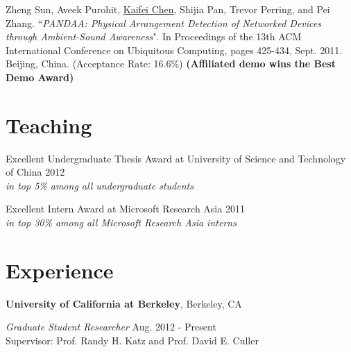 \documentclass[margin,line]{res}
\begin{document}
\begin{resume}
      \vspace*{-2.0mm}
      Zheng Sun, Aveek Purohit, \underline{Kaifei Chen}, Shijia Pan, Trevor Perring, and Pei Zhang. ``{\it PANDAA: Physical Arrangement Detection of Networked Devices through Ambient-Sound Awareness}". In Proceedings of the 13th ACM International Conference on Ubiquitous Computing, pages 425-434, Sept. 2011. Beijing, China. (Acceptance Rate: 16.6\%) {\bf (Affiliated demo wins the Best Demo Award)}


    \section{\sc Teaching}

      Excellent Undergraduate Thesis Award at University of Science and Technology of China \hfill 2012\\
      {\it in top 5\% among all undergraduate students}

      \vspace*{-2.5mm}
      Excellent Intern Award at Microsoft Research Asia \hfill 2011\\
      {\it in top 30\% among all Microsoft Research Asia interns}


    \section{\sc Experience}

      {\bf University of California at Berkeley}, Berkeley, CA

      \vspace{-.3cm}
      {\em Graduate Student Researcher} \hfill Aug. 2012 - Present\\
      Supervisor: Prof. Randy H. Katz and Prof. David E. Culler\\


\end{resume}
\end{document}
